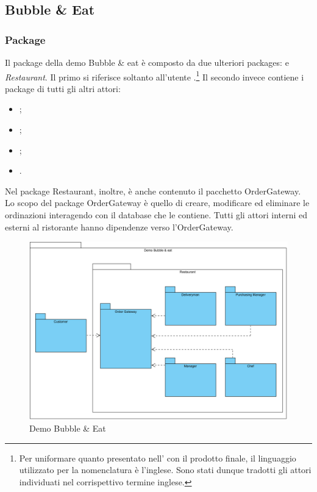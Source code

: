 \subsection{Bubble \& Eat}

\subsubsection{Package}
Il package della demo Bubble \& eat è composto da due ulteriori packages: \Customer{} e \textit{Restaurant}. 
Il primo si riferisce soltanto all'utente \Customer{}.\footnote{Per uniformare quanto presentato nell'\AnalisiDeiRequisiti{} con il prodotto finale, il linguaggio utilizzato per la nomenclatura è l'inglese. Sono stati dunque tradotti gli attori individuati nel corrispettivo termine inglese.} Il secondo invece contiene i package di tutti gli altri attori:
\begin{itemize}
	\item \Manager{};
	\item \Chef{};
	\item \Deliveryman{};
	\item \Purchasingmanager{}.
\end{itemize}
Nel package Restaurant, inoltre, è anche contenuto il pacchetto Order\-Gateway.\\
Lo scopo del package Order\-Gateway è quello di creare, modificare ed eliminare le ordinazioni interagendo con il database che le contiene.
Tutti gli attori interni ed esterni al ristorante hanno dipendenze verso l'Order\-Gateway.
\begin{figure}[H]
	\centering
	\includegraphics[width=14cm]{diagrammi_img/classi_e_package/demo_packages.png}
	\caption{Demo Bubble \& Eat}
\end{figure}

